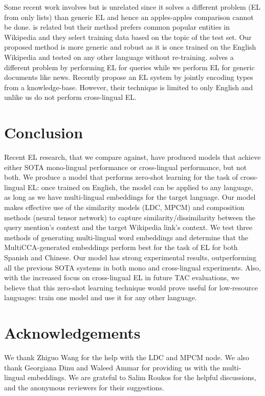 \documentclass[letterpaper]{article} \usepackage{aaai18}  \usepackage{times}  \usepackage{helvet}  \usepackage{courier}  \usepackage{url}  \usepackage{graphicx}  \frenchspacing  \setlength{\pdfpagewidth}{8.5in}  \setlength{\pdfpageheight}{11in}  \usepackage{latexsym}
\begin{document}
Some recent work involves \cite{lin2017list} but is unrelated since it solves a different problem (EL from only lists) than generic EL and hence an apples-apples comparison cannot be done. \cite{pan2017cross} is related but their method prefers common popular entities in Wikipedia and they select training data based on the topic of the test set. Our proposed method is more generic and robust as it is once trained on the English Wikipedia and tested on any other language without re-training. \cite{tan2017entity} solves a different problem by performing EL for queries while we perform EL for generic documents like news. Recently \cite{gupta2017entity} propose an EL system by jointly encoding types from a knowledge-base. However, their technique is limited to only English and unlike us do not perform cross-lingual EL. 






 
\section{Conclusion}

\label{sec:conclusion}
Recent EL research, that we compare against, have produced models that achieve either SOTA mono-lingual performance or cross-lingual performance, but not both. We produce a model that performs zero-shot learning for the task of cross-lingual EL: once trained on English, the model can be applied to any language, as long as we have multi-lingual embeddings for the target language. Our model makes effective use of the similarity models (LDC, MPCM) and composition methods (neural tensor network) to capture similarity/dissimilarity between the query mention's context and the target Wikipedia link's context. We test three methods of generating multi-lingual word embeddings and determine that the MultiCCA-generated embeddings perform best for the task of EL for both Spanish and Chinese. Our model has strong experimental results, outperforming all the previous SOTA systems in both mono and cross-lingual experiments. Also, with the increased focus on cross-lingual EL in future TAC evaluations, we believe that this zero-shot learning technique would prove useful for low-resource languages: train one model and use it for any other language.


\section{Acknowledgements}
We thank Zhiguo Wang for the help with the LDC and MPCM node. We also thank Georgiana Dinu and Waleed Ammar for providing us with the multi-lingual embeddings. We are grateful to Salim Roukos for the helpful discussions, and the anonymous reviewers for their suggestions.






\end{document}

